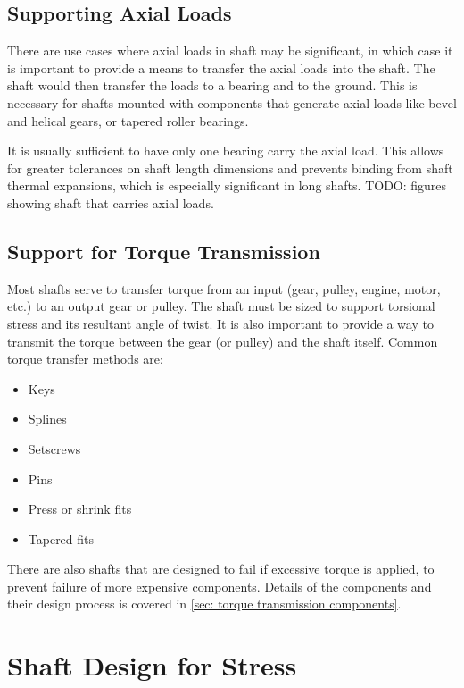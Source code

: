 \documentclass[
10pt,
a4paper,
openany,
svgnames,
]{book}
\begin{document}
\subsection{Supporting Axial Loads}

There are use cases where axial loads in shaft may be significant, in which case it is important to provide a means to transfer the axial loads into the shaft. The shaft would then transfer the loads to a bearing and to the ground. This is necessary for shafts mounted with components that generate axial loads like bevel and helical gears, or tapered roller bearings.

It is usually sufficient to have only one bearing carry the axial load. This allows for greater tolerances on shaft length dimensions and prevents binding from shaft thermal expansions, which is especially significant in long shafts. TODO: figures showing shaft that carries axial loads.

\subsection{Support for Torque Transmission}

Most shafts serve to transfer torque from an input (gear, pulley, engine, motor, etc.) to an output gear or pulley. The shaft must be sized to support torsional stress and its resultant angle of twist. It is also important to provide a way to transmit the torque between the gear (or pulley) and the shaft itself. Common torque transfer methods are:

\begin{itemize}
\item Keys
\item Splines
\item Setscrews
\item Pins
\item Press or shrink fits
\item Tapered fits
\end{itemize}

There are also shafts that are designed to fail if excessive torque is applied, to prevent failure of more expensive components. Details of the components and their design process is covered in \cref{sec: torque transmission components}.

\section{Shaft Design for Stress}
\end{document}
